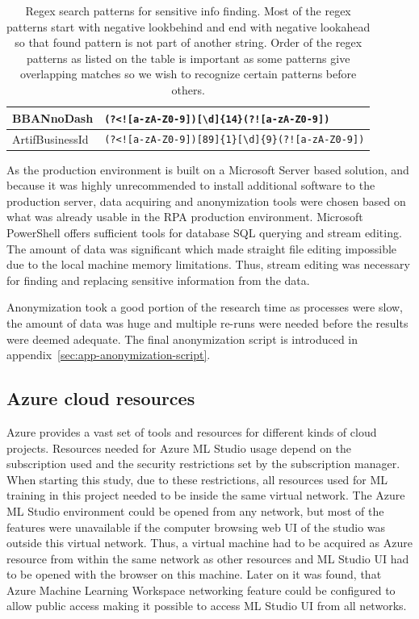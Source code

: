 \begin{table}[]
\begin{tabularx}{\textwidth}{|L{0.18\textwidth}|Y|}
        BBANnoDash &
        \verb=(?<![a-zA-Z0-9])[\d]{14}(?![a-zA-Z0-9])=
        \\ \hline
        ArtifBusiness\-Id &
        \verb=(?<![a-zA-Z0-9])[89]{1}[\d]{9}(?![a-zA-Z0-9])=
        \\ \hline
    \end{tabularx}
    \caption{Regex search patterns for sensitive info finding.
    Most of the regex patterns start with negative lookbehind
    and end with negative lookahead
    so that found pattern is not part of another string.
    Order of the regex patterns as listed on the table is important
    as some patterns give overlapping matches
    so we wish to recognize certain patterns before others.}
    \label{tab:regex-sensitive-regex}
\end{table}

As the production environment is built on a Microsoft Server based solution,
and because it was highly unrecommended
to install additional software to the production server,
data acquiring and anonymization tools were chosen
based on what was already usable in the RPA production environment.
Microsoft PowerShell offers sufficient tools
for database SQL querying
and stream editing.
The amount of data was significant
which made straight file editing impossible
due to the local machine memory limitations.
Thus, stream editing was necessary
for finding and replacing
sensitive information from the data.

Anonymization took a good portion of the research time
as processes were slow,
the amount of data was huge
and multiple re-runs were needed
before the results were deemed adequate.
The final anonymization script
is introduced in appendix~\ref{sec:app-anonymization-script}.


\subsection{Azure cloud resources}\label{subsec:meth-azure-cloud resources}

Azure provides a vast set of tools and resources
for different kinds of cloud projects.
Resources needed for Azure ML Studio usage
depend on the subscription used
and the security restrictions set by the subscription manager.
When starting this study,
due to these restrictions,
all resources used for ML training in this project
needed to be inside the same virtual network.
The Azure ML Studio environment could be opened from any network,
but most of the features were unavailable
if the computer browsing web UI of the studio was outside this virtual network.
Thus,
a virtual machine had to be acquired as Azure resource
from within the same network as other resources
and ML Studio UI had to be opened with the browser on this machine.
Later on it was found,
that Azure Machine Learning Workspace networking feature
could be configured to allow public access
making it possible to access ML Studio UI from all networks.

